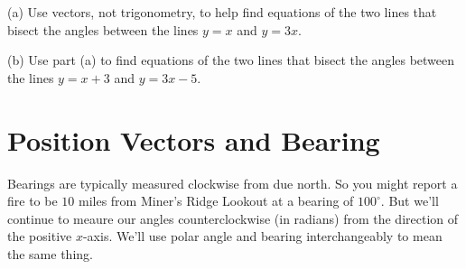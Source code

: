 \documentclass{ximera}
\begin{document}
\begin{question}   \label{Q6547:Vectors}
(a) Use vectors, not trigonometry, to help find equations of the two lines that bisect the angles between the lines $y=x$ and $y=3x$.

(b) Use part (a) to find equations of the two lines that bisect the angles between the lines $y=x+3$ and $y=3x-5$.


\end{question}


\section{Position Vectors and Bearing}

Bearings are typically measured clockwise from due north. So you might report a fire to be $10$ miles from Miner's Ridge Lookout at a bearing of $100^\circ$. But we'll continue to meaure our angles counterclockwise (in radians) from the direction of the positive $x$-axis. We'll use polar angle and bearing interchangeably to mean the same thing.
\end{document}
